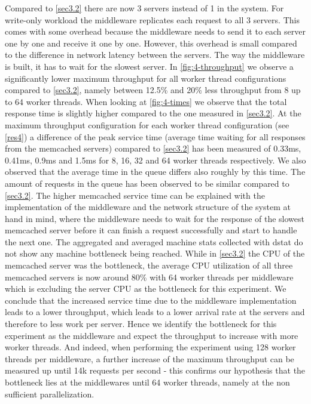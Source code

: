 \documentclass[11pt,a4paper]{article}
\begin{document}
Compared to \autoref{sec3.2} there are now 3 servers instead of 1 in the system. For write-only workload the middleware replicates each request to all 3 servers. This comes with some overhead because the middleware needs to send it to each server one by one and receive it one by one. However, this overhead is small compared to the difference in network latency between the servers. The way the middleware is built, it has to wait for the slowest server. 
In \autoref{fig:4-throughput} we observe a significantly lower maximum throughput for all worker thread configurations compared to \autoref{sec3.2}, namely between 12.5\% and 20\% less throughput from 8 up to 64 worker threads. When looking at \autoref{fig:4-times} we observe that the total response time is slightly higher compared to the one measured in \autoref{sec3.2}.
At the maximum throughput configuration for each worker thread configuration (see \autoref{res4}) a difference of the peak service time (average time waiting for all responses from the memcached servers) compared to \autoref{sec3.2} has been measured of 0.33ms, 0.41ms, 0.9ms and 1.5ms for 8, 16, 32 and 64 worker threads respectively. We also observed that the average time in the queue differs also roughly by this time. The amount of requests in the queue has been observed to be similar compared to \autoref{sec3.2}. The higher memcached service time can be explained with the implementation of the middleware and the network structure of the system at hand in mind, where the middleware needs to wait for the response of the slowest memcached server before it can finish a request successfully and start to handle the next one.
The aggregated and averaged machine stats collected with dstat do not show any machine bottleneck being reached. While in \autoref{sec3.2} the CPU of the memcached server was the bottleneck, the average CPU utilization of all three memcached servers is now around 80\% with 64 worker threads per middleware which is excluding the server CPU as the bottleneck for this experiment. We conclude that the increased service time due to the middleware implementation leads to a lower throughput, which leads to a lower arrival rate at the servers and therefore to less work per server. Hence we identify the bottleneck for this experiment as the middleware and expect the throughput to increase with more worker threads. And indeed, when performing the experiment using 128 worker threads per middleware, a further increase of the maximum throughput can be measured up until 14k requests per second - this confirms our hypothesis that the bottleneck lies at the middlewares until 64 worker threads, namely at the non sufficient parallelization.
\end{document}
